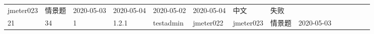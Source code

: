 \documentclass[hyperref, a4paper]{ctexart}
\begin{document}
\begin{longtable}[]{@{}llllllllllllll@{}}
\begin{minipage}[t]{0.04\columnwidth}
jmeter023\strut
\end{minipage} & \begin{minipage}[t]{0.03\columnwidth}\raggedright
情景题\strut
\end{minipage} & \begin{minipage}[t]{0.05\columnwidth}\raggedright
2020-05-03\strut
\end{minipage} & \begin{minipage}[t]{0.05\columnwidth}\raggedright
2020-05-04\strut
\end{minipage} & \begin{minipage}[t]{0.08\columnwidth}\raggedright
2020-05-02\strut
\end{minipage} & \begin{minipage}[t]{0.08\columnwidth}\raggedright
2020-05-04\strut
\end{minipage} & \begin{minipage}[t]{0.04\columnwidth}\raggedright
中文\strut
\end{minipage} & \begin{minipage}[t]{0.02\columnwidth}\raggedright
失败\strut
\end{minipage}\tabularnewline
\begin{minipage}[t]{0.02\columnwidth}\raggedright
21\strut
\end{minipage} & \begin{minipage}[t]{0.05\columnwidth}\raggedright
34\strut
\end{minipage} & \begin{minipage}[t]{0.03\columnwidth}\raggedright
1\strut
\end{minipage} & \begin{minipage}[t]{0.07\columnwidth}\raggedright
1.2.1\strut
\end{minipage} & \begin{minipage}[t]{0.04\columnwidth}\raggedright
testadmin\strut
\end{minipage} & \begin{minipage}[t]{0.04\columnwidth}\raggedright
jmeter022\strut
\end{minipage} & \begin{minipage}[t]{0.04\columnwidth}\raggedright
jmeter023\strut
\end{minipage} & \begin{minipage}[t]{0.03\columnwidth}\raggedright
情景题\strut
\end{minipage} & \begin{minipage}[t]{0.05\columnwidth}\raggedright
2020-05-03\strut

\end{minipage}
\end{longtable}
\end{document}
